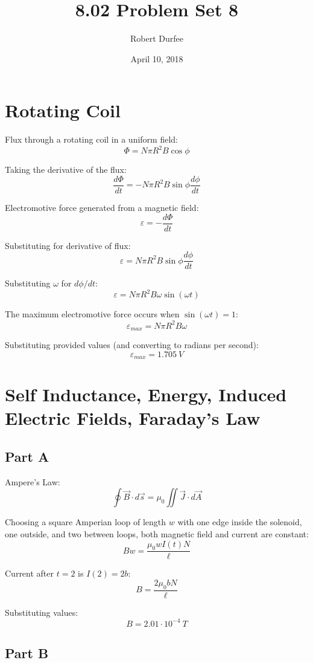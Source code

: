 \documentclass{article}
\title{ 8.02 Problem Set 8 }
\author{ Robert Durfee }
\date{ April 10, 2018 }
\begin{document}
\maketitle

\section{Rotating Coil }

Flux through a rotating coil in a uniform field:
$$ \Phi = N \pi R^2 B \cos \phi $$

Taking the derivative of the flux:
$$ \frac{d\Phi}{dt} = - N \pi R^2 B \sin \phi \frac{d\phi}{dt} $$

Electromotive force generated from a magnetic field:
$$ \varepsilon = - \frac{d\Phi}{dt} $$

Substituting for derivative of flux:
$$ \varepsilon = N \pi R^2 B \sin \phi \frac{d\phi}{dt} $$

Substituting $\omega$ for $d\phi/dt$:
$$ \varepsilon = N \pi R^2 B \omega \sin (\omega t) $$

The maximum electromotive force occurs when $\sin (\omega t) = 1$:
$$ \varepsilon_{max} = N \pi R^2 B \omega $$

Substituting provided values (and converting to radians per second):
$$ \varepsilon_{max} = 1.705\ \si{V} $$

\section{Self Inductance, Energy, Induced Electric Fields, Faraday's Law}

\subsection*{Part A}

Ampere's Law:
$$ \oint \vec{B} \cdot d\vec{s} = \mu_0 \iint \vec{J} \cdot d\vec{A} $$

Choosing a square Amperian loop of length $w$ with one edge inside the solenoid,
one outside, and two between loops, both magnetic field and current are
constant:
$$ B w = \frac{\mu_0 w I(t) N}{\ell} $$

Current after $t = 2$ is $I(2) = 2b$:
$$ B = \frac{2 \mu_0 b N}{\ell} $$

Substituting values:
$$ B = 2.01 \cdot 10^{-4}\ \si{T} $$

\subsection*{Part B}
\end{document}
